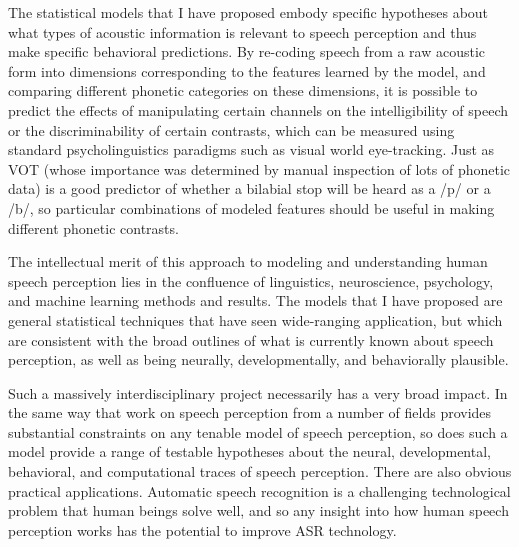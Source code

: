 \documentclass[12pt]{article}
\begin{document}




The statistical models that I have proposed embody specific hypotheses about what types of acoustic information is relevant to speech perception and thus make specific behavioral predictions.  By re-coding speech from a raw acoustic form into dimensions corresponding to the features learned by the model, and comparing different phonetic categories on these dimensions, it is possible to predict the effects of manipulating certain channels on the intelligibility of speech or the discriminability of certain contrasts, which can be measured using standard psycholinguistics paradigms such as visual world eye-tracking.  Just as VOT (whose importance was determined by manual inspection of lots of phonetic data) is a good predictor of whether a bilabial stop will be heard as a /p/ or a /b/, so particular combinations of modeled features should be useful in making different phonetic contrasts.

The intellectual merit of this approach to modeling and understanding human speech perception lies in the confluence of linguistics, neuroscience, psychology, and machine learning methods and results.  The models that I have proposed are general statistical techniques that have seen wide-ranging application, but which are consistent with the broad outlines of what is currently known about speech perception, as well as being neurally, developmentally, and behaviorally plausible.

Such a massively interdisciplinary project necessarily has a very broad impact.  In the same way that work on speech perception from a number of fields provides substantial constraints on any tenable model of speech perception, so does such a model provide a range of testable hypotheses about the neural, developmental, behavioral, and computational traces of speech perception.  There are also obvious practical applications.  Automatic speech recognition is a challenging technological problem that human beings solve well, and so any insight into how human speech perception works has the potential to improve ASR technology.  

%


\end{document}

